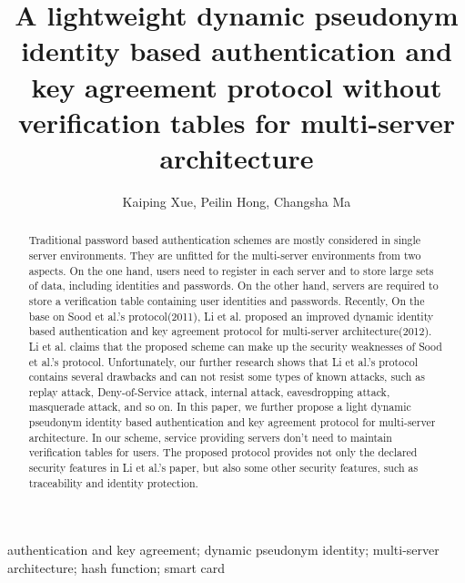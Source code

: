 \documentclass[preprint,12pt]{elsarticle}
\begin{document}
\begin{frontmatter}





\title{A lightweight dynamic pseudonym identity based authentication and key agreement protocol without verification tables for multi-server architecture}



\author{Kaiping Xue, Peilin Hong, Changsha Ma}


\address{The Information Network Lab of EEIS Department, USTC, Hefei, 230027, China}

\begin{abstract}
Traditional password based authentication schemes are mostly considered in single server environments. They are unfitted for the multi-server environments from two aspects. On the one hand, users need to register in each server and to store large sets of data, including identities and passwords.  On the other hand, servers are required to store a verification table containing user identities and passwords. Recently, On the base on Sood et al.'s protocol(2011), Li et al. proposed an improved dynamic identity based authentication and key agreement protocol for multi-server architecture(2012). Li et al. claims that the proposed scheme can make up the security weaknesses of Sood et al.'s protocol. Unfortunately, our further research shows that Li et al.'s protocol contains several drawbacks and can not resist some types of known attacks, such as replay attack, Deny-of-Service attack, internal attack, eavesdropping attack, masquerade attack, and so on. In this paper, we further propose a light dynamic pseudonym identity based authentication and key agreement protocol for multi-server architecture. In our scheme, service providing servers don't need to maintain verification tables for users. The proposed protocol provides not only the declared security features in Li et al.'s paper, but also some other security features, such as traceability and identity protection.

\end{abstract}

\begin{keyword}
authentication and key agreement; dynamic pseudonym identity; multi-server architecture; hash function; smart card


\end{keyword}

\end{frontmatter}
\end{document}
